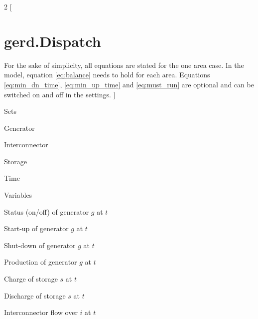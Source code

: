 \documentclass[a4paper,11pt]{article}
\begin{document}
\begin{multicols}{2}
[
\section*{gerd.Dispatch}
For the sake of simplicity, all equations are stated for the one area case. In the model, equation \ref{eq:balance} needs to hold for each area.
Equations \ref{eq:min_dn_time}, \ref{eq:min_up_time} and \ref{eq:must_run} are optional and can be switched on and off in the settings.
]


\noindent Sets
\begin{description}[labelindent=10pt,labelwidth=40pt]
\item[$g$]  Generator
\item[$i$]  Interconnector
\item[$s$]  Storage
\item[$t$]  Time
\end{description}

\noindent Variables
\begin{description}[labelindent=10pt,labelwidth=40pt]
\item[$u_{g,t}$]    Status (on/off) of generator $g$ at $t$
\item[$v_{g,t}$]    Start-up of generator $g$ at $t$
\item[$w_{g,t}$]    Shut-down of generator $g$ at $t$
\item[$p_{g,t}$]    Production of generator $g$ at $t$
\item[$c_{s,t}$]    Charge of storage $s$ at $t$
\item[$d_{s,t}$]    Discharge of storage $s$ at $t$
\item[$x_{i,t}$]    Interconnector flow over $i$ at $t$
\end{description}


\end{multicols}
\end{document}
